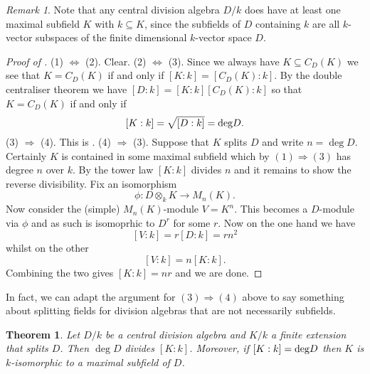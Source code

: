 \documentclass[11pt]{amsart}
\numberwithin{equation}{section}
\newtheorem{theorem}[equation]{Theorem}
\theoremstyle{remark}
\newtheorem{remark}[equation]{Remark}
\theoremstyle{remark}
\theoremstyle{remark}
\theoremstyle{definition}
\theoremstyle{definition}
\theoremstyle{definition}
\theoremstyle{definition}
\theoremstyle{definition}
\theoremstyle{definition}
\begin{document}
\begin{remark}
Note that any central division algebra $D/k$ does have at least one maximal subfield $K$ with $k\subseteq K$, since the subfields of $D$ containing $k$ are all $k$-vector subspaces of the finite dimensional $k$-vector space $D$.
\end{remark}

\begin{proof}[Proof of ]
(1) $\Leftrightarrow$ (2). Clear. (2) $\Leftrightarrow$ (3). Since we always have $K\subseteq C_D(K)$ we see that $K=C_D(K)$ if and only if $[K:k]=[C_D(K):k]$. By the double centraliser theorem we have $[D:k]=[K:k][C_D(K):k]$ so that $K=C_D(K)$ if and only if \[[K:k]=\sqrt{[D:k]}=\textup{deg}D.\] (3) $\Rightarrow$ (4). This is . (4) $\Rightarrow$ (3). Suppose that $K$ splits $D$ and write $n=\deg D$. Certainly $K$ is contained in some maximal subfield which by $(1)\Rightarrow (3)$ has degree $n$ over $k$. By the tower law $[K:k]$ divides $n$ and it remains to show the reverse divisibility. Fix an isomorphism
\[\phi:D\otimes_k K\rightarrow M_n(K).\]
Now consider the (simple) $M_n(K)$-module $V=K^n$. This becomes a $D$-module via $\phi$ and as such is isomoprhic to $D^r$ for some $r$. Now on the one hand we have
\[[V:k]=r[D:k]=rn^2\]
whilst on the other 
\[[V:k]=n[K:k].\]
Combining the two gives $[K:k]=nr$ and we are done.
\end{proof}

In fact, we can adapt the argument for $(3)\Rightarrow (4)$ above to say something about splitting fields for division algebras that are not necessarily subfields.

\begin{theorem} \label{divisibility and field embedding}
Let $D/k$ be a central division algebra and $K/k$ a finite extension that splits $D$. Then $\deg D$ divides $[K:k]$. Moreover, if $[K:k]=\textup{deg}D$ then $K$ is $k$-isomorphic to a maximal subfield of $D$.
\end{theorem}
\end{document}
